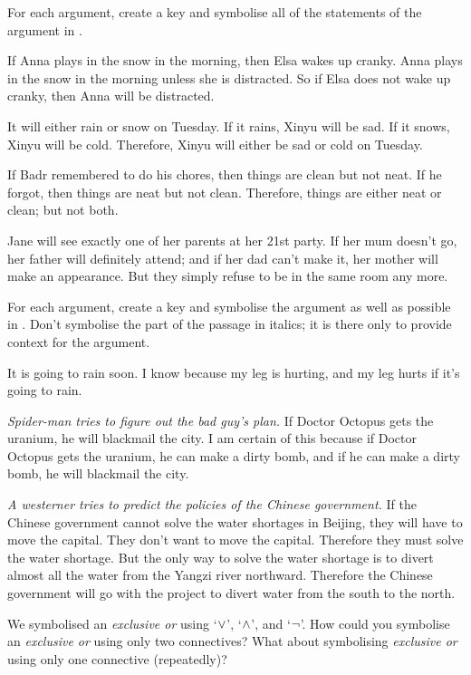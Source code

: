 \documentclass[PHIL101-Textbook.tex]{subfiles}
\begin{document}
\noindent\solutions
\problempart \label{pr.complexargument1}
For each argument, create a key and symbolise all of the statements of the argument in \tfl.
\begin{earg}
\item If Anna plays in the snow in the morning, then Elsa wakes up cranky. Anna plays in the snow in the morning unless she is distracted. So if Elsa does not wake up cranky, then  Anna will be distracted.
\item It will either rain or snow on Tuesday. If it rains, Xinyu will be sad. If it snows, Xinyu will be cold. Therefore, Xinyu will either be sad or cold on Tuesday.
\item If Badr remembered to do his chores, then things are clean but not neat. If he forgot, then things are neat but not clean. Therefore, things are either neat or clean; but not both.
\item Jane will see exactly one of her parents at her 21st party. If her mum doesn't go, her father will definitely attend; and if her dad can't make it, her mother will make an appearance. But they simply refuse to be in the same room any more.
\end{earg}


\pagebreak
\noindent\problempart
For each argument, create a key and symbolise the argument as well as possible in \tfl. Don't symbolise the part of the passage in italics; it is there only to provide context for the argument.
\begin{earg}
\item It is going to rain soon. I know because my leg is hurting, and my leg hurts if it's going to rain. 

\item  \emph{Spider-man tries to figure out the bad guy's plan.} If Doctor Octopus gets the uranium, he will blackmail the city. I am certain of this because if Doctor Octopus gets the uranium, he can make a dirty bomb, and if he can make a dirty bomb, he will blackmail the city.

\item \emph{A westerner tries to predict the policies of the Chinese government.} If the Chinese government cannot solve the water shortages in Beijing, they will have to move the capital. They don't want to move the capital. Therefore they must solve the water shortage. But the only way to solve the water shortage is to divert almost all the water from the Yangzi river northward. Therefore the Chinese government will go with the project to divert water from the south to the north.       
\end{earg}


\noindent\problempart
We symbolised an \emph{exclusive or} using `$\vee$', `$\land$', and `$\neg$'. How could you symbolise an \emph{exclusive or} using only two connectives? What about symbolising  \emph{exclusive or} using only one connective (repeatedly)?
\end{document}
